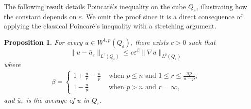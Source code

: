 \documentclass[12pt]{amsart}
\newtheorem{prop}[thm]{Proposition}
\theoremstyle{definition}
\theoremstyle{remark}
\numberwithin{equation}{section}
\begin{document}
The following result details Poincar\'e's inequality on the cube $Q_\varepsilon$, illustrating how the constant depends on $\varepsilon$. We  omit the proof since it is a direct consequence of applying the classical Poincar\'e's inequality with a stretching argument.

 






\begin{prop} \label{prop1}
For every $u\in W^{1,p}(Q_\varepsilon)$, there exists $c>0$ such that
$$
\|u-\bar u_\varepsilon\|_{L^r(Q_\varepsilon)} \leq c   \varepsilon^\beta \|\nabla u\|_{L^p(Q_\varepsilon)}
$$
where 
\begin{align*}
\beta= 
\begin{cases}
1+\frac{n}{r}-\frac{n}{p} &\text{ when } p \leq n \text{ and } 1\leq r \leq \frac{np}{n-p},\\
1-\frac{n}{p} &\text{ when } p> n \text{ and } r=\infty,
\end{cases}
\end{align*}
and $\bar u_\varepsilon$ is the average of $u$ in $Q_\varepsilon$.
\end{prop}


\end{document}
